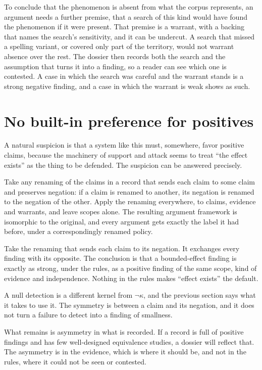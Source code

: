 \documentclass[11pt]{article}
\newcommand{\nk}[1]{\neg #1}
\begin{document}
To conclude that the phenomenon is absent from what the corpus represents, an argument needs a further premise, that a search of this kind would have found the phenomenon if it were present. That premise is a warrant, with a backing that names the search's sensitivity, and it can be undercut. A search that missed a spelling variant, or covered only part of the territory, would not warrant absence over the rest. The dossier then records both the search and the assumption that turns it into a finding, so a reader can see which one is contested. A case in which the search was careful and the warrant stands is a strong negative finding, and a case in which the warrant is weak shows as such.

\section{No built-in preference for positives}\label{sec:symmetry}

A natural suspicion is that a system like this must, somewhere, favor positive claims, because the machinery of support and attack seems to treat ``the effect exists'' as the thing to be defended. The suspicion can be answered precisely.

Take any renaming of the claims in a record that sends each claim to some claim and preserves negation: if a claim is renamed to another, its negation is renamed to the negation of the other. Apply the renaming everywhere, to claims, evidence and warrants, and leave scopes alone. The resulting argument framework is isomorphic to the original, and every argument gets exactly the label it had before, under a correspondingly renamed policy.

Take the renaming that sends each claim to its negation. It exchanges every finding with its opposite. The conclusion is that a bounded-effect finding is exactly as strong, under the rules, as a positive finding of the same scope, kind of evidence and independence. Nothing in the rules makes ``effect exists'' the default.

A null detection is a different kernel from $\nk\kappa$, and the previous section says what it takes to use it. The symmetry is between a claim and its negation, and it does not turn a failure to detect into a finding of smallness.

What remains is asymmetry in what is recorded. If a record is full of positive findings and has few well-designed equivalence studies, a dossier will reflect that. The asymmetry is in the evidence, which is where it should be, and not in the rules, where it could not be seen or contested.
\end{document}
